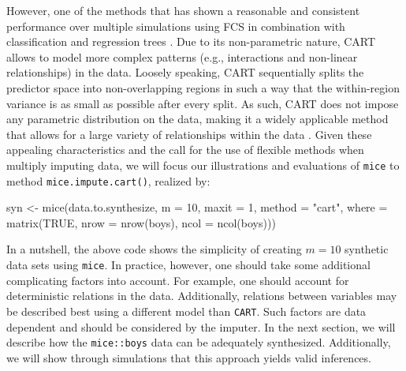 \documentclass[psych,article,submit,moreauthors,pdftex]{mdpi}
\newenvironment{Shaded}{\begin{snugshade}}{\end{snugshade}}
\newcommand{\AttributeTok}[1]{\textcolor[rgb]{0.77,0.63,0.00}{#1}}
\newcommand{\ConstantTok}[1]{\textcolor[rgb]{0.00,0.00,0.00}{#1}}
\newcommand{\DecValTok}[1]{\textcolor[rgb]{0.00,0.00,0.81}{#1}}
\newcommand{\FunctionTok}[1]{\textcolor[rgb]{0.00,0.00,0.00}{#1}}
\newcommand{\NormalTok}[1]{#1}
\newcommand{\OtherTok}[1]{\textcolor[rgb]{0.56,0.35,0.01}{#1}}
\newcommand{\StringTok}[1]{\textcolor[rgb]{0.31,0.60,0.02}{#1}}
\begin{document}
However, one of the methods that has shown a reasonable and consistent
performance over multiple simulations using FCS in combination with
classification and regression trees
\citep[CART;][]{breiman_cart_1984, reiter_cart_2005, burgette_reiter_cart_2010, doove_buuren_recursive_2014, raab_practical_2016}.
Due to its non-parametric nature, CART allows to model more complex
patterns (e.g., interactions and non-linear relationships) in the data.
Loosely speaking, CART sequentially splits the predictor space into
non-overlapping regions in such a way that the within-region variance is
as small as possible after every split. As such, CART does not impose
any parametric distribution on the data, making it a widely applicable
method that allows for a large variety of relationships within the data
\citep{islr_2013}. Given these appealing characteristics and the call
for the use of flexible methods when multiply imputing data, we will
focus our illustrations and evaluations of \texttt{mice} to method
\texttt{mice.impute.cart()}, realized by:

\begin{Shaded}
\begin{Highlighting}[]
\NormalTok{syn }\OtherTok{\textless{}{-}} \FunctionTok{mice}\NormalTok{(data.to.synthesize, }
            \AttributeTok{m =} \DecValTok{10}\NormalTok{,}
            \AttributeTok{maxit =} \DecValTok{1}\NormalTok{, }
            \AttributeTok{method =} \StringTok{"cart"}\NormalTok{,}
            \AttributeTok{where =} \FunctionTok{matrix}\NormalTok{(}\ConstantTok{TRUE}\NormalTok{, }
                           \AttributeTok{nrow =} \FunctionTok{nrow}\NormalTok{(boys),}
                           \AttributeTok{ncol =} \FunctionTok{ncol}\NormalTok{(boys)))}
\end{Highlighting}
\end{Shaded}

In a nutshell, the above code shows the simplicity of creating
\(m = 10\) synthetic data sets using \texttt{mice}. In practice,
however, one should take some additional complicating factors into
account. For example, one should account for deterministic relations in
the data. Additionally, relations between variables may be described
best using a different model than \texttt{CART}. Such factors are data
dependent and should be considered by the imputer. In the next section,
we will describe how the \texttt{mice::boys} data
\citep{fredriks_boys_2000} can be adequately synthesized. Additionally,
we will show through simulations that this approach yields valid
inferences.
\end{document}
